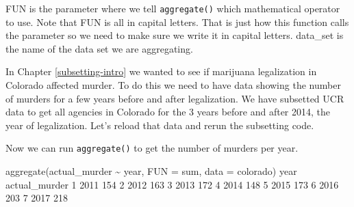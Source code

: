 \documentclass[
  12pt,
  openany]{book}
\newenvironment{Shaded}{\begin{snugshade}}{\end{snugshade}}
\newcommand{\AttributeTok}[1]{\textcolor[rgb]{0.61,0.61,0.61}{#1}}
\newcommand{\DecValTok}[1]{\textcolor[rgb]{0.06,0.06,0.06}{#1}}
\newcommand{\FunctionTok}[1]{\textcolor[rgb]{0,0,0}{#1}}
\newcommand{\NormalTok}[1]{#1}
\newcommand{\OtherTok}[1]{\textcolor[rgb]{0.37,0.37,0.37}{#1}}
\newcommand{\SpecialCharTok}[1]{\textcolor[rgb]{0,0,0}{#1}}
\newcommand{\StringTok}[1]{\textcolor[rgb]{0.5,0.5,0.5}{#1}}
\begin{document}
FUN is the parameter where we tell \texttt{aggregate()} which mathematical operator to use. Note that FUN is all in capital letters. That is just how this function calls the parameter so we need to make sure we write it in capital letters. data\_set is the name of the data set we are aggregating.

In Chapter \ref{subsetting-intro} we wanted to see if marijuana legalization in Colorado affected murder. To do this we need to have data showing the number of murders for a few years before and after legalization. We have subsetted UCR data to get all agencies in Colorado for the 3 years before and after 2014, the year of legalization. Let's reload that data and rerun the subsetting code.

\begin{Shaded}
\end{Shaded}

Now we can run \texttt{aggregate()} to get the number of murders per year.

\begin{Shaded}
\begin{Highlighting}[]
\FunctionTok{aggregate}\NormalTok{(actual\_murder }\SpecialCharTok{\textasciitilde{}}\NormalTok{ year, }\AttributeTok{FUN =}\NormalTok{ sum, }\AttributeTok{data =}\NormalTok{ colorado)}
\NormalTok{  year actual\_murder}
\DecValTok{1} \DecValTok{2011}           \DecValTok{154}
\DecValTok{2} \DecValTok{2012}           \DecValTok{163}
\DecValTok{3} \DecValTok{2013}           \DecValTok{172}
\DecValTok{4} \DecValTok{2014}           \DecValTok{148}
\DecValTok{5} \DecValTok{2015}           \DecValTok{173}
\DecValTok{6} \DecValTok{2016}           \DecValTok{203}
\DecValTok{7} \DecValTok{2017}           \DecValTok{218}
\end{Highlighting}
\end{Shaded}
\end{document}
